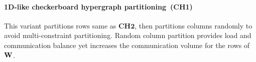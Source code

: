 

\paragraph{1D-like checkerboard hypergraph partitioning~(\textbf{CH1})}
This variant partitions rows same as $\textbf{CH2}$, then partitions columns randomly to avoid multi-constraint partitioning.
Random column partition provides load and communication balance yet increases the communication volume for the rows of $\mathbf{W}$.

